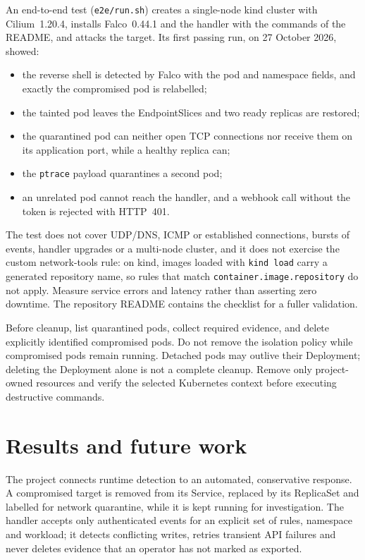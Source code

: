 An end-to-end test (\texttt{e2e/run.sh}) creates a single-node kind cluster with
Cilium~1.20.4, installs Falco~0.44.1 and the handler with the commands of the
README, and attacks the target. Its first passing run, on 27 October 2026, showed:
\begin{itemize}
\item the reverse shell is detected by Falco with the pod and namespace fields, and
exactly the compromised pod is relabelled;
\item the tainted pod leaves the EndpointSlices and two ready replicas are restored;
\item the quarantined pod can neither open TCP connections nor receive them on its
application port, while a healthy replica can;
\item the \texttt{ptrace} payload quarantines a second pod;
\item an unrelated pod cannot reach the handler, and a webhook call without the token
is rejected with HTTP~401.
\end{itemize}
The test does not cover UDP/DNS, ICMP or established connections, bursts of events,
handler upgrades or a multi-node cluster, and it does not exercise the custom
network-tools rule: on kind, images loaded with \texttt{kind load} carry a generated
repository name, so rules that match \texttt{container.image.repository} do not apply.
Measure service errors and latency rather than asserting zero downtime. The repository
README contains the checklist for a fuller validation.

Before cleanup, list quarantined pods, collect required evidence, and delete explicitly
identified compromised pods. Do not remove the isolation policy while compromised
pods remain running. Detached pods may outlive their Deployment; deleting the
Deployment alone is not a complete cleanup. Remove only project-owned resources and
verify the selected Kubernetes context before executing destructive commands.

\section{Results and future work}
The project connects runtime detection to an automated, conservative response.
A compromised target is removed from its Service, replaced by its ReplicaSet and
labelled for network quarantine, while it is kept running for investigation. The
handler accepts only authenticated events for an explicit set of rules, namespace
and workload; it detects conflicting writes, retries transient API failures and
never deletes evidence that an operator has not marked as exported.

